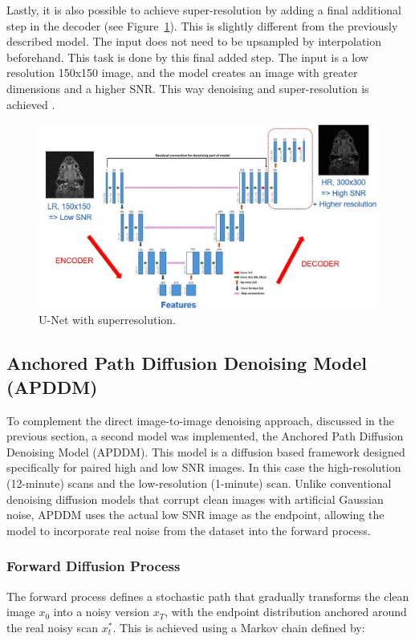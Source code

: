 \documentclass[twocolumn]{article}
\begin{document}
Lastly, it is also possible to achieve super-resolution by adding a final additional step in the decoder (see Figure~\ref{fig:U-Net superres}). This is slightly different from the previously described model. The input does not need to be upsampled by interpolation beforehand. This task is done by this final added step. The input is a low resolution 150x150 image, and the model creates an image with greater dimensions and a higher SNR. This way denoising and super-resolution is achieved \cite{tran2025unet}. 

\begin{figure}
    \centering
    \includegraphics[width=0.85\linewidth]{U-Net with superresolution.jpg}
    \caption{U-Net with superresolution.}
    \label{fig:U-Net superres}
\end{figure}



\subsection{Anchored Path Diffusion Denoising Model (APDDM)}
To complement the direct image-to-image denoising approach, discussed in the previous section, a second model was implemented, the Anchored Path Diffusion Denoising Model (APDDM). This model is a diffusion based framework designed specifically for paired high and low SNR images. In this case the high-resolution (12-minute) scans and the low-resolution (1-minute) scan. Unlike conventional denoising diffusion models that corrupt clean images with artificial Gaussian noise, APDDM uses the actual low SNR image as the endpoint, allowing the model to incorporate real noise from the dataset into the forward process. 

\subsubsection{Forward Diffusion Process}
The forward process defines a stochastic path that gradually transforms the clean image $x_0$ into a noisy version $x_T$, with the endpoint distribution anchored around the real noisy scan $x_t^*$. This is achieved using a Markov chain defined by:
\end{document}
